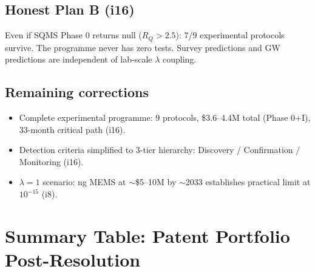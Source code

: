 \documentclass[11pt]{article}
\begin{document}
\subsection{Honest Plan B (i16)}
Even if SQMS Phase 0 returns null ($R_Q > 2.5$): 7/9 experimental protocols survive.
The programme never has zero tests. Survey predictions and GW predictions are independent
of lab-scale $\lambda$ coupling.

\subsection{Remaining corrections}
\begin{itemize}
\item Complete experimental programme: 9 protocols, \$3.6--4.4M total (Phase 0+I),
33-month critical path (i16).
\item Detection criteria simplified to 3-tier hierarchy: Discovery / Confirmation /
Monitoring (i16).
\item $\lambda = 1$ scenario: ng MEMS at $\sim$\$5--10M by $\sim$2033 establishes
practical limit at $10^{-15}$ (i8).
\end{itemize}

\newpage
\section{Summary Table: Patent Portfolio Post-Resolution}
\end{document}

